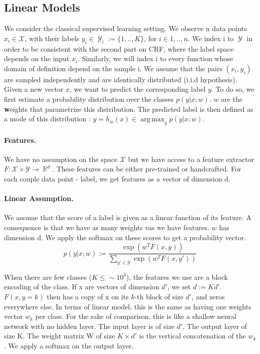 \documentclass{article}
\DeclareMathOperator{\R}{\mathbb{R}}
\DeclareMathOperator{\1}{\mathbb{1}}
\DeclareMathOperator{\Y}{\mathcal{Y}}
\DeclareMathOperator*{\argmax}{arg\,max}
\begin{document}
\subsection{Linear Models}

We consider the classical supervised learning setting.
We observe n data points $x_i \in \mathcal{X}$, with their labels $y_i\in \Y_i:= \{1,..,K\}$, for $i \in {1,..,n}$.
We index i to $\Y$ in order to be consistent with the second part on CRF, where the label space depends on the input $x_i$.
Similarly, we will index i to every function whose domain of definition depend on the sample i.
We assume that the pairs $(x_i, y_i)$ are sampled independently and are identically distributed (i.i.d hypothesis).
Given a new vector $x$, we want to predict the corresponding label $y$. 
To do so, we first estimate a probability distribution over the classes $p(y|x ; w)$.
$w$ are the \textbf{w}eights that parametrize this distribution. 
The predicted label is then defined as a mode of this distribution : $\hat y = h_w(x) \in \argmax_y p(y| x ; w)$.

\paragraph{Features.}
We have no assumption on the space $\mathcal X$ but we have access to a feature extractor $F:\mathcal X \times \mathcal Y \rightarrow \R^d$.
These features can be either pre-trained or handcrafted.
For each couple data point - label, we get features as a vector of dimension d.

\paragraph{Linear Assumption.}
We assume that the score of a label is given as a linear function of its feature.
A consequence is that we have as many weights vas we have  features.
$w$ has dimension d.
We apply the softmax on these scores to get a probability vector. 
\begin{equation}
	\label{primal probability}
	p(y | x ; w) := \frac{\exp(w^TF(x, y))}{\sum_{y' \in \mathcal{Y}} \exp(w^TF(x, y'))}
\end{equation}

When there are few classes ($K \leq \sim 10^3$), the features we use are a block encoding of the class.
If x are vectors of dimension $d'$, we set $d:=Kd'$. $F(x, y=k)$ then has a copy of x on its $k$-th block of size $d'$, and zeros everywhere else.
In terms of linear model, this is the same as having one weights vector $w_k$ per class.
For the sake of comparison, this is like a shallow neural network with no hidden layer.
The input layer is of size $d'$.
The output layer of size K.
The weight matrix W of size $K \times d'$ is the vertical concatenation of the $w_k$.
We apply a softmax on the output layer.
\end{document}
